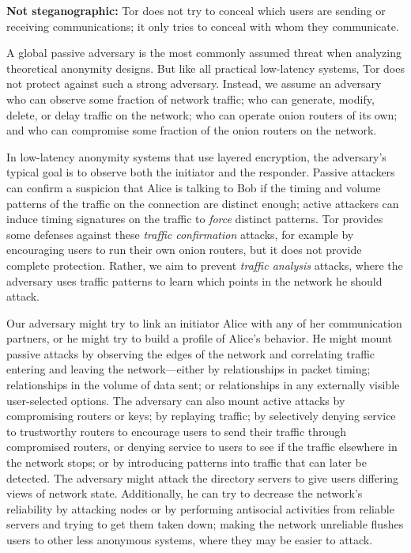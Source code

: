 \documentclass[times,10pt,twocolumn]{article}
\begin{document}
\textbf{Not steganographic:} Tor does not try to conceal which users are
sending or receiving communications; it only tries to conceal with whom
they communicate.

\label{subsec:threat-model}

A global passive adversary is the most commonly assumed threat when
analyzing theoretical anonymity designs. But like all practical
low-latency systems, Tor does not protect against such a strong
adversary. Instead, we assume an adversary who can observe some fraction
of network traffic; who can generate, modify, delete, or delay traffic
on the network; who can operate onion routers of its own; and who can
compromise some fraction of the onion routers on the network.

In low-latency anonymity systems that use layered encryption, the
adversary's typical goal is to observe both the initiator and the
responder. Passive attackers can confirm a suspicion that Alice is
talking to Bob if the timing and volume patterns of the traffic on the
connection are distinct enough; active attackers can induce timing
signatures on the traffic to \emph{force} distinct patterns. Tor provides
some defenses against these \emph{traffic confirmation} attacks, for
example by encouraging users to run their own onion routers, but it does
not provide complete protection. Rather, we aim to prevent \emph{traffic
analysis} attacks, where the adversary uses traffic patterns to learn
which points in the network he should attack.

Our adversary might try to link an initiator Alice with any of her
communication partners, or he might try to build a profile of Alice's
behavior. He might mount passive attacks by observing the edges of the
network and correlating traffic entering and leaving the network---either
by relationships in packet timing; relationships in the volume
of data sent; or relationships in any externally visible user-selected
options. The adversary can also mount active attacks by compromising
routers or keys; by replaying traffic; by selectively denying service
to trustworthy routers to encourage users to send their traffic through
compromised routers, or denying service to users to see if the traffic
elsewhere in the
network stops; or by introducing patterns into traffic that can later be
detected. The adversary might attack the directory servers to give users
differing views of network state. Additionally, he can try to decrease
the network's reliability by attacking nodes or by performing antisocial
activities from reliable servers and trying to get them taken down;
making the network unreliable flushes users to other less anonymous
systems, where they may be easier to attack.
\end{document}
